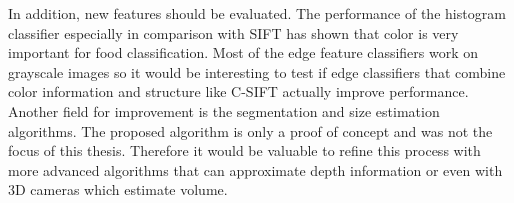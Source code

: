 \newline\newline
In addition, new features should be evaluated. The performance of the histogram classifier especially in comparison with SIFT has shown that color is very important for food classification. Most of the edge feature classifiers work on grayscale images so it would be interesting to test if edge classifiers that combine color information and structure like C-SIFT actually improve performance. 
\newline\newline
Another field for improvement is the segmentation and size estimation algorithms. The proposed algorithm is only a proof of concept and was not the focus of this thesis. Therefore it would be valuable to refine this process with more advanced algorithms that can approximate depth information or even with 3D cameras which estimate volume.